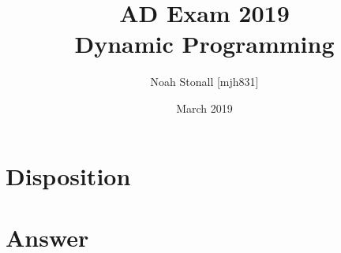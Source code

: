 \documentclass{article}
\title{AD Exam 2019 \\ Dynamic Programming}
\author{Noah Stonall [mjh831]}
\date{March 2019}
\begin{document}
\maketitle

\section*{Disposition}

\newpage
\section*{Answer}

\end{document}
